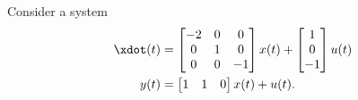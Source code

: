 \documentclass[10pt]{article}
\begin{document}
\section{}
Consider a system 
\begin{equation*}
  \begin{split}
    \xdot(t) &=
    \begin{bmatrix}
      -2 & 0 & 0 \\ 0 & 1 & 0 \\ 0 & 0 & -1
    \end{bmatrix}x(t) +
    \begin{bmatrix}
      1 \\ 0 \\ -1
    \end{bmatrix}u(t)\\
    y(t) &= 
    \begin{bmatrix}
      1 & 1 & 0
    \end{bmatrix}x(t) + u(t).
  \end{split}
\end{equation*}
\end{document}
